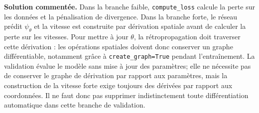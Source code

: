 \documentclass[11pt,a4paper]{article}
\begin{document}
\textbf{Solution commentée.} Dans la branche faible,
\texttt{compute\_loss} calcule la perte sur les données et
la pénalisation de divergence. Dans la branche forte, le
réseau prédit $\psi_\theta$ et la vitesse est construite par
dérivation spatiale avant de calculer la perte sur les vitesses.
Pour mettre à jour $\theta$, la rétropropagation doit
traverser cette dérivation : les opérations spatiales doivent
donc conserver un graphe différentiable, notamment grâce à
\texttt{create\_graph=True} pendant l'entraînement.
La validation évalue le modèle sans mise à jour des
paramètres; elle ne nécessite pas de conserver le graphe
de dérivation par rapport aux paramètres, mais la
construction de la vitesse forte exige toujours des
dérivées par rapport aux coordonnées. Il ne faut donc pas
supprimer indistinctement toute différentiation automatique
dans cette branche de validation.
\end{document}
